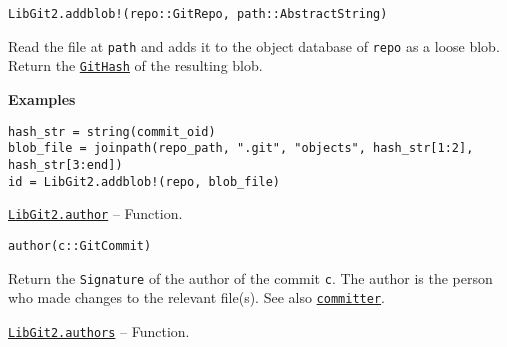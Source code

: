 \begin{adjustwidth}{2em}{0pt}


\begin{verbatim}
LibGit2.addblob!(repo::GitRepo, path::AbstractString)
\end{verbatim}

Read the file at \texttt{path} and adds it to the object database of \texttt{repo} as a loose blob. Return the \hyperlink{202290709580230708}{\texttt{GitHash}} of the resulting blob.

\textbf{Examples}


\begin{verbatim}
hash_str = string(commit_oid)
blob_file = joinpath(repo_path, ".git", "objects", hash_str[1:2], hash_str[3:end])
id = LibGit2.addblob!(repo, blob_file)
\end{verbatim}



\end{adjustwidth}
\hypertarget{7024880280540966409}{} 
\hyperlink{7024880280540966409}{\texttt{LibGit2.author}}  -- {Function.}

\begin{adjustwidth}{2em}{0pt}


\begin{verbatim}
author(c::GitCommit)
\end{verbatim}

Return the \texttt{Signature} of the author of the commit \texttt{c}. The author is the person who made changes to the relevant file(s). See also \hyperlink{4819166445750615913}{\texttt{committer}}.



\end{adjustwidth}
\hypertarget{13671452176500407122}{} 
\hyperlink{13671452176500407122}{\texttt{LibGit2.authors}}  -- {Function.}

